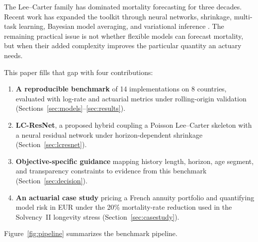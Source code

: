 \documentclass[11pt,a4paper]{article}
\begin{document}
The Lee--Carter family \citep{lee1992modeling} has dominated mortality forecasting for three decades. Recent work has expanded the toolkit through neural networks, shrinkage, multi-task learning, Bayesian model averaging, and variational inference \citep{richman2019neural,barigou2023bma,li2025boosting,demori2025multitask,andersson2026variational}. The remaining practical issue is not whether flexible models can forecast mortality, but when their added complexity improves the particular quantity an actuary needs.

This paper fills that gap with four contributions:

\begin{enumerate}
    \item \textbf{A reproducible benchmark} of 14 implementations on 8 countries, evaluated with log-rate and actuarial metrics under rolling-origin validation (Sections~\ref{sec:models}--\ref{sec:results}).
    \item \textbf{LC-ResNet}, a proposed hybrid coupling a Poisson Lee--Carter skeleton with a neural residual network under horizon-dependent shrinkage (Section~\ref{sec:lcresnet}).
    \item \textbf{Objective-specific guidance} mapping history length, horizon, age segment, and transparency constraints to evidence from this benchmark (Section~\ref{sec:decision}).
    \item \textbf{An actuarial case study} pricing a French annuity portfolio and quantifying model risk in EUR under the 20\% mortality-rate reduction used in the Solvency~II longevity stress (Section~\ref{sec:casestudy}).
\end{enumerate}

Figure~\ref{fig:pipeline} summarizes the benchmark pipeline.
\end{document}
